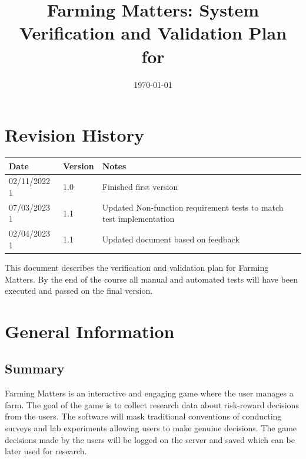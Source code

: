 \documentclass[12pt, titlepage]{article}
\begin{document}
\title{Farming Matters: System Verification and Validation Plan for \progname{}} 
\author{\authname}
\date{\today}
	
\maketitle


\section{Revision History}

\begin{tabularx}{\textwidth}{p{3cm}p{2cm}X}
\toprule {\bf Date} & {\bf Version} & {\bf Notes}\\
\midrule
02/11/2022 1 & 1.0 & Finished first version\\
07/03/2023 1 & 1.1 & Updated Non-function requirement tests to match test implementation\\
02/04/2023 1 & 1.1 & Updated document based on feedback\\
\bottomrule
\end{tabularx}

\newpage

\tableofcontents

\listoftables

\listoffigures


\newpage


This document describes the verification and validation plan for Farming Matters. By the end of the course all manual and automated tests will have been executed and passed on the final version. 

\section{General Information}

\subsection{Summary}
Farming Matters is an interactive and engaging game where the user manages a farm. The goal of the game is to collect research data about risk-reward decisions from the users. The software will mask traditional conventions of conducting surveys and
lab experiments allowing users to make genuine decisions. The game decisions made by the users will be logged on the server and saved which can be later used for research.
\end{document}

